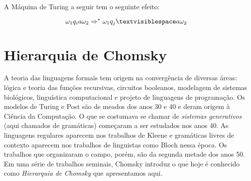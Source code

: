 \begin{example}
  \label{ex:space}
  A Máquina de Turing a seguir tem o seguinte efeito:

  \begin{displaymath}
    \omega_1 q_i a \omega_2 \Rightarrow^* \omega_1 q_j \textvisiblespace a \omega_2
  \end{displaymath}

  
\end{example}


\section{Hierarquia de Chomsky}

A teoria das linguagens formais tem origem na convergência de diversas áreas:
lógica e teoria das funções recursivas, circuitos booleanos, modelagem de sistemas biológicos, linguística computacional e projeto de linguagens de programação.
Os modelos de Turing e Post são de meados dos anos 30 e 40 e deram origem à Ciência da Computação.
O que se costumava se chamar de {\em sistemas generativos} (aqui chamados de gramáticas) começaram a ser estudados nos anos 40.
As linguagens regulares aparecem nos trabalhos de Kleene e gramáticas livres de contexto aparecem nos trabalhos de linguistas como Bloch nessa época.
Os trabalhos que organizaram o campo, porém, são da segunda metade dos anos 50.
Em uma série de trabalhos seminais, Chomsky introduz o que hoje é conhecido como {\em Hierarquia de Chomsky} que apresentamos aqui.


